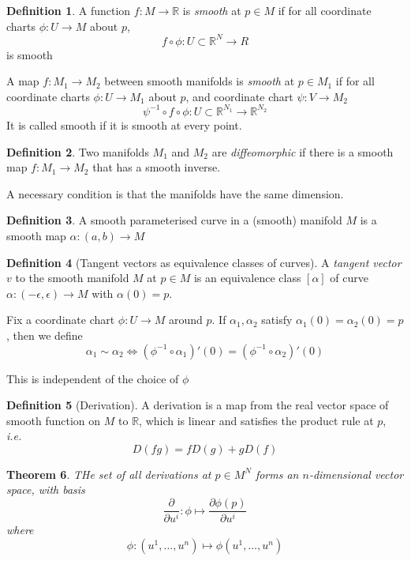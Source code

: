 \documentclass[10pt, oneside, reqno]{amsart}
\newcommand{\R}{\mathbb{R}}
\theoremstyle{plain}%
\newtheorem{thm}{Theorem}[section]
\theoremstyle{definition}
\newtheorem{defn}[thm]{Definition}
\theoremstyle{remark}
\begin{document}
\begin{defn}
    A function $f: M \rightarrow \R$ is \emph{smooth} at $p \in M$ if for all coordinate charts $\phi: U \rightarrow M$ about $p$, \[
        f \circ \phi : U \subset \R^N \rightarrow R
    \] is smooth
    
    A map $f : M_1 \rightarrow M_2$ between smooth manifolds is \emph{smooth} at $p \in M_1$ if for all coordinate charts $\phi : U \rightarrow M_1$ about $p$, and coordinate chart $\psi : V \rightarrow M_2$\[
        \psi^{-1} \circ f \circ \phi : U \subset \R^{N_1} \rightarrow \R^{N_2}
    \]
    It is called smooth if it is smooth at every point.

\end{defn}

\begin{defn}
    Two manifolds $M_1$ and $M_2$ are \emph{diffeomorphic} if there is a smooth map $f: M_1 \rightarrow M_2$ that has a smooth inverse.
    
    A necessary condition is that the manifolds have the same dimension.
\end{defn}

\begin{defn}
    A smooth parameterised curve in a (smooth) manifold $M$ is a smooth map $\alpha : (a,b) \rightarrow M$
\end{defn}

\begin{defn}[Tangent vectors as equivalence classes of curves]
    A \emph{tangent vector} $v$ to the smooth manifold $M$ at $p \in M$ is an equivalence class $[\alpha]$ of curve $\alpha: (-\epsilon, \epsilon) \rightarrow M$ with $\alpha(0) = p$. 
    
    Fix a coordinate chart $\phi: U \rightarrow M$ around $p$.  If $\alpha_1, \alpha_2$ satisfy $\alpha_1(0) = \alpha_2(0) = p$, then we define \[
        \alpha_1 \sim \alpha_2 \Leftrightarrow (\phi^{-1} \circ \alpha_1)'(0) = (\phi^{-1} \circ \alpha_2)'(0)
    \]
    
    This is independent of the choice of $\phi$
\end{defn}

\begin{defn}[Derivation]
    A derivation is a map from the real vector space of smooth function on $M$ to $\R$, which is linear and satisfies the product rule at $p$, \emph{i.e.} \[
        D(fg) = fD(g) + gD(f)
    \]
\end{defn}

\begin{thm}
    THe set of all derivations at $p \in M^N$ forms an $n$-dimensional vector space, with basis \[
        \frac{\partial}{\partial u^i} : \phi \mapsto \frac{\partial \phi(p)}{\partial u^i}
    \]
    where \[
        \phi :(u^1,\dots, u^n) \mapsto \phi(u^1,\dots,u^n)
    \]
\end{thm}
\end{document}

